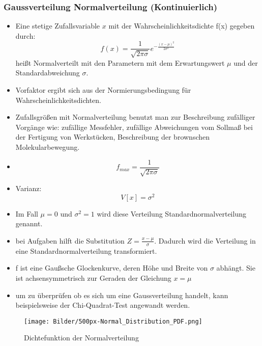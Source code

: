 \documentclass[10pt,a4paper]{article}
\begin{document}
\subsubsection{Gaussverteilung Normalverteilung (Kontinuierlich)}
\begin{itemize}
\item Eine stetige Zufallsvariable $x$ mit der Wahrscheinlichkeitsdichte f(x) gegeben durch:
\begin{equation}
f(x) = \frac{1}{\sqrt{2\pi \sigma}}e^{-\frac{(x-\mu)^2}{2\sigma^2}}
\end{equation}
heißt Normalverteilt mit den Parametern mit dem Erwartungswert $\mu$ und der Standardabweichung $\sigma$.
\item Vorfaktor ergibt sich aus der Normierungsbedingung für Wahrscheinlichkeitsdichten.
\item Zufallsgrößen mit Normalverteilung benutzt man zur Beschreibung zufälliger Vorgänge wie: zufällige Messfehler, zufällige Abweichungen vom Sollmaß bei der Fertigung von Werkstücken, Beschreibung der brownschen Molekularbewegung.
\item 
\begin{equation}
	f_{max}= \frac{1}{\sqrt{2\pi \sigma}}
\end{equation}
\item Varianz:
	\begin{equation}
		V[x]=\sigma^2
	\end{equation}
\item  Im Fall $\mu= 0$ und $\sigma^2=1$ wird diese Verteilung Standardnormalverteilung genannt.
\item bei Aufgaben hilft die Substitution $Z=\frac{x-\mu }{\sigma}$. Dadurch wird die Verteilung in eine Standardnormalverteilung transformiert.
\item f ist eine Gaußsche Glockenkurve, deren Höhe und Breite von $\sigma$ abhängt. Sie ist achsensymmetrisch zur Geraden der Gleichung $x=\mu$
\item um zu überprüfen ob es sich um eine Gaussverteilung handelt, kann beispielsweise der Chi-Quadrat-Test angewandt werden.
\end{itemize}
\begin{figure}[hbtp]
\caption{Dichtefunktion der Normalverteilung }
\centering
\texttt{[image: Bilder/500px-Normal\_Distribution\_PDF.png]}
\end{figure}

\newpage
\end{document}
